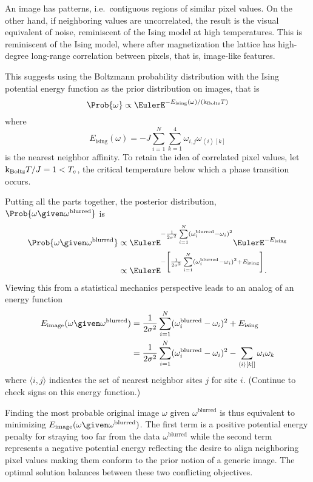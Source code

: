 \documentclass[12pt]{article}
\newcommand{\kT}{{\text k}_{\text{Boltz}}T}
\begin{document}
An image has patterns, i.e.\ contiguous regions of similar pixel
values. On the other hand, if neighboring values are uncorrelated, the
result is the visual equivalent of noise, reminiscent of the Ising
model at high temperatures.  This is reminiscent of the Ising model,
where after magnetization the lattice has high-degree long-range
correlation between pixels, that is, image-like features.

This suggests using the Boltzmann probability distribution with the
Ising potential energy function as the prior distribution on images, that is
\[
    \Prob{\omega} \propto \EulerE^{-E_{\text{ising}}(\omega)/(\kT)}
\] where
\[
    E_{\text{ising}}(\omega) = -J \sum\limits_{i=1}^{N} \sum\limits_{k=1}^4
    \omega_{i, j} \omega_{\left\langle i \right\rangle[k]}
\] is the nearest neighbor affinity. To retain the idea of correlated
pixel values, let \( \kT/J = 1 < T_c \), the critical temperature below
which a phase transition occurs.

Putting all the parts together, the posterior distribution, \( \Prob{\omega
\given \omega^{\text{blurred}}} \) is
\begin{align*}
    \Prob{\omega \given \omega^{\text{blurred}}} &\propto \EulerE^{-\frac
    {1}{2\sigma^2 } \sum\limits_{i=1}^N(\omega_i^{\text{blurred}} -
    \omega_i)^{2}} \EulerE^{-E_{\text{ising}}} \\
    &\propto \EulerE^{-\left[ \frac{1}{2\sigma^2 } \sum\limits_{i=1}^N(\omega_i^
    {\text{blurred}} - \omega_i)^{2} + E_{\text{ising}} \right] }.
\end{align*}
Viewing this from a statistical mechanics perspective leads to an analog
of an energy function
\begin{align*}
    E_{\text{image}}(\omega \given \omega^{\text{blurred}}) &= \frac{1}{2\sigma^2
    } \sum\limits_{i=1}^N(\omega_i^{\text{blurred}} - \omega_i)^{2} + E_
    {\text{ising}} \\
    &= \frac{1}{2\sigma^2 } \sum\limits_{i=1}^N(\omega_i^{\text{blurred}}
    - \omega_i)^{2} - \sum\limits_{\langle i\rangle [k]]} \omega_i\omega_k
    \\
\end{align*}
where \( {\langle i,j\rangle} \) indicates the set of nearest neighbor
sites \( j \) for site \( i \).  (Continue to check signs on this energy
function.)

Finding the most probable original image \( \omega \) given \( \omega^{\text
{blurred}} \) is thus equivalent to minimizing \( E_{\text{image}}(\omega
\given \omega^{\text{blurred}}) \).  The first term is a positive
potential energy penalty for straying too far from the data \( \omega^{\text
{blurred}} \) while the second term represents a negative potential
energy reflecting the desire to align neighboring pixel values making
them conform to the prior notion of a generic image.  The optimal
solution balances between these two conflicting objectives.
\end{document}
